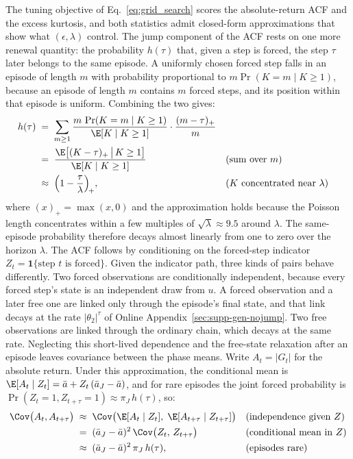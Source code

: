 The tuning objective of Eq.~\eqref{eq:grid_search} scores the
absolute-return ACF and the excess kurtosis, and both statistics
admit closed-form approximations that show what $(\epsilon, \lambda)$
control. The jump component of the ACF rests on one more renewal
quantity: the probability $h(\tau)$ that, given a step is forced, the
step $\tau$ later belongs to the same episode. A uniformly chosen
forced step falls in an episode of length $m$ with probability
proportional to $m \Pr(K = m \mid K \ge 1)$, because an episode of
length $m$ contains $m$ forced steps, and its position within that
episode is uniform. Combining the two gives:
\begin{align}
  h(\tau)
   &\;=\; \sum_{m \ge 1}
     \frac{m\, \Pr(K = m \mid K \ge 1)}{\E[K \mid K \ge 1]}
     \cdot \frac{(m - \tau)_+}{m}
     \notag \\
   &\;=\; \frac{\E\big[(K - \tau)_+ \,\big|\, K \ge 1\big]}
     {\E[K \mid K \ge 1]}
     && \text{(sum over $m$)} \notag \\
   &\;\approx\; \Big(1 - \frac{\tau}{\lambda}\Big)_{\!+},
     && \text{($K$ concentrated near $\lambda$)}
  \label{eq:supp-h}
\end{align}
where $(x)_+ = \max(x, 0)$ and the approximation holds because the
Poisson length concentrates within a few multiples of
$\sqrt{\lambda} \approx 9.5$ around $\lambda$. The same-episode
probability therefore decays almost linearly from one to zero over
the horizon $\lambda$. The ACF follows by conditioning on the
forced-step indicator $Z_t = \mathbf{1}\{\text{step $t$ is forced}\}$.
Given the indicator path, three kinds of pairs behave differently.
Two forced observations are conditionally independent, because every
forced step's state is an independent draw from $u$. A forced
observation and a later free one are linked only through the
episode's final state, and that link decays at the rate
$|\theta_2|^\tau$ of Online Appendix~\ref{sec:supp-gen-nojump}. Two
free observations are linked through the ordinary chain, which decays
at the same rate. Neglecting this short-lived dependence and the free-state relaxation
after an episode leaves covariance between the phase means. Write
$A_t = |G_t|$ for the absolute return. Under this approximation, the conditional mean is
$\E[A_t \mid Z_t] = \bar a + Z_t\, (\bar a_J - \bar a)$,
and for rare episodes the joint forced probability is
$\Pr(Z_t = 1, Z_{t+\tau} = 1) \approx \pi_J\, h(\tau)$, so:
\begin{align}
  \Cov\big(A_t, A_{t+\tau}\big)
   &\;\approx\;
     \Cov\big(\E[A_t \mid Z_t],\;
              \E[A_{t+\tau} \mid Z_{t+\tau}]\big)
     && \text{(independence given $Z$)} \notag \\
   &\;=\; (\bar a_J - \bar a)^2\,
     \Cov\big(Z_t,\, Z_{t+\tau}\big)
     && \text{(conditional mean in $Z$)} \notag \\
   &\;\approx\; (\bar a_J - \bar a)^2\, \pi_J\, h(\tau),
     && \text{(episodes rare)}
  \label{eq:supp-acf-wj}
\end{align}
